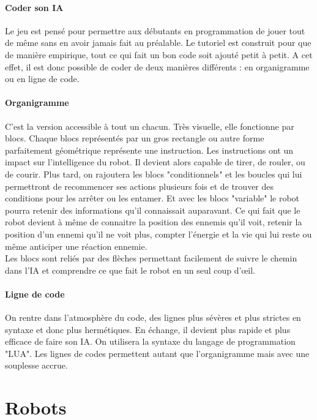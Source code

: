 \documentclass[10pt]{article}
\begin{document}
\subsection{Coder son IA}

Le jeu est pensé pour permettre aux débutants en programmation de jouer tout de même sans en avoir jamais fait au préalable. Le tutoriel est construit pour que de manière empirique, tout ce qui fait un bon code soit ajouté petit à petit. A cet effet, il est donc possible de coder de deux manières différents : en organigramme ou en ligne de code.

\subsection*{Organigramme}

C'est la version accessible à tout un chacun. Très visuelle, elle fonctionne par blocs. Chaque blocs représentés par un gros rectangle ou autre forme parfaitement géométrique représente une instruction. Les instructions ont un impact sur l'intelligence du robot. Il devient alors capable de tirer, de rouler, ou de courir. Plus tard, on rajoutera les blocs "conditionnels" et les boucles qui lui permettront de recommencer ses actions plusieurs fois et de trouver des conditions pour les arrêter ou les entamer. Et avec les blocs "variable" le robot pourra retenir des informations qu'il connaissait auparavant.
Ce qui fait que le robot devient à même de connaitre la position des ennemis qu'il voit, retenir la position d'un ennemi qu'il ne voit plus, compter l'énergie et la vie qui lui reste ou même anticiper une réaction ennemie.\\
Les blocs sont reliés par des flèches permettant facilement de suivre le chemin dans l'IA et comprendre ce que fait le robot en un seul coup d'œil.

\subsection*{Ligne de code}

On rentre dans l'atmosphère du code, des lignes plus sévères et plus strictes en syntaxe et donc plus hermétiques. En échange, il devient plus rapide et plus efficace de faire son IA. On utilisera la syntaxe du langage de programmation "LUA". Les lignes de codes permettent autant que l'organigramme mais avec une souplesse accrue.




\newpage
\setcounter{section}{0}
\part{Robots}
\end{document}
